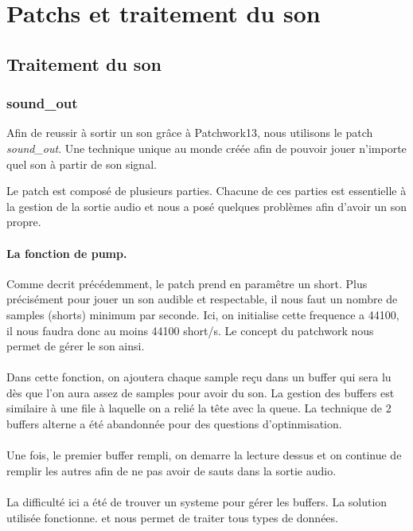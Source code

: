 \chapter{Patchs et traitement du son}

\section{Traitement du son }

\subsection{sound\_out}
\par
Afin de reussir \`a sortir un son gr\^ace \`a Patchwork13, nous utilisons le patch
\textit{sound\_out}. Une technique unique au monde cr\'e\'ee afin de pouvoir jouer
n'importe quel son \`a partir de son signal.
\\
\par
Le patch est compos\'e de plusieurs parties. Chacune de ces parties est essentielle
\`a la gestion de la sortie audio et nous a pos\'e quelques probl\`emes afin d'avoir
un son propre.
\\
\subsubsection{La fonction de \textbf{pump}.}
  \par
  Comme decrit pr\'ec\'edemment, le patch prend en param\^etre un short. Plus pr\'ecis\'ement pour jouer un son audible et
  respectable, il nous faut un nombre de samples (shorts) minimum par seconde. Ici, on
  initialise cette frequence a 44100, il nous faudra donc au moins 44100 short/s. Le concept
  du patchwork nous permet de g\'erer le son ainsi.
  \\
  \\
  Dans cette fonction, on ajoutera chaque sample re\c{c}u dans un buffer qui sera lu d\`es que l'on
  aura assez de samples pour avoir du son. La gestion des buffers est similaire \`a une file
  \`a laquelle on a reli\'e la t\^ete avec la queue. La technique de 2 buffers alterne a \'et\'e
  abandonn\'ee pour des questions d'optinmisation.
  \\
  \\
  Une fois, le premier buffer rempli, on demarre la lecture dessus et on continue de
  remplir les autres afin de ne pas avoir de sauts dans la sortie audio.
  \\
  \\
  La difficult\'e ici a \'et\'e de trouver un systeme pour g\'erer les buffers. La solution utilis\'ee
  fonctionne. et nous permet de traiter tous types de donn\'ees.
  \\
